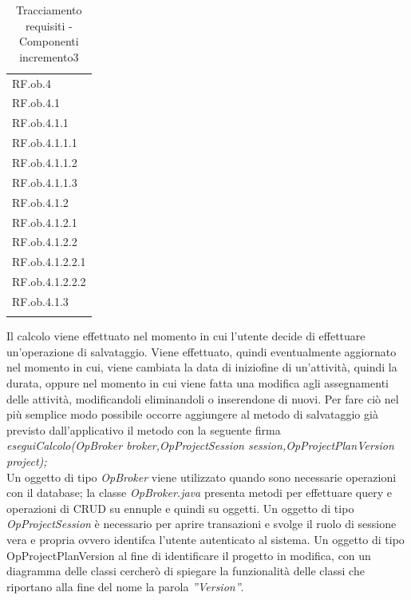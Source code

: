 \begin{longtable}{|>{\centering}p{3cm}|}
    \hline
    \multicolumn{1}{|c|}{\textbf{Requisiti}} \\ %
      \hline
        RF.ob.4 \tabularnewline \hline
		RF.ob.4.1 \tabularnewline \hline
		RF.ob.4.1.1 \tabularnewline \hline		
		RF.ob.4.1.1.1 \tabularnewline \hline
		RF.ob.4.1.1.2 \tabularnewline \hline
		RF.ob.4.1.1.3 \tabularnewline \hline
		RF.ob.4.1.2 \tabularnewline \hline
		RF.ob.4.1.2.1 \tabularnewline \hline
		RF.ob.4.1.2.2 \tabularnewline \hline
		RF.ob.4.1.2.2.1 \tabularnewline \hline
		RF.ob.4.1.2.2.2 \tabularnewline \hline
		RF.ob.4.1.3 \tabularnewline \hline
    \caption{Tracciamento requisiti - Componenti incremento3}
    \label{tab:Tracciamento requisiti - Componenti incremento3}
\end{longtable}

Il calcolo viene effettuato nel momento in cui l\textquoteright{}utente decide di effettuare un\textquoteright{}operazione di salvataggio. Viene effettuato, quindi eventualmente aggiornato nel momento in cui, viene cambiata la data di inizio\/fine di un\textquoteright{}attivit\`{a}, quindi la durata, oppure nel momento in cui viene fatta una modifica agli assegnamenti delle attivit\`{a}, modificandoli eliminandoli o inserendone di nuovi. Per fare ci\`{o} nel pi\`{u} semplice modo possibile occorre aggiungere al metodo di salvataggio gi\`{a} previsto dall\textquoteright{}applicativo il metodo con la seguente firma \\
\textit{eseguiCalcolo(OpBroker broker,OpProjectSession session,OpProjectPlanVersion project);} \\
Un oggetto di tipo \textit{OpBroker} viene utilizzato quando sono necessarie operazioni con il database; la classe \textit{OpBroker.java} presenta metodi per effettuare query e operazioni di CRUD su ennuple e quindi su oggetti. Un oggetto di tipo \textit{OpProjectSession} \`{e} necessario per aprire transazioni e svolge il ruolo di sessione vera e propria ovvero identifca l\textquoteright{}utente autenticato al sistema. Un oggetto di tipo OpProjectPlanVersion al fine di identificare il progetto in modifica, con un diagramma delle classi cercher\`{o} di spiegare la funzionalit\`{a} delle classi che riportano alla fine del nome la parola \textit{''Version''}.

